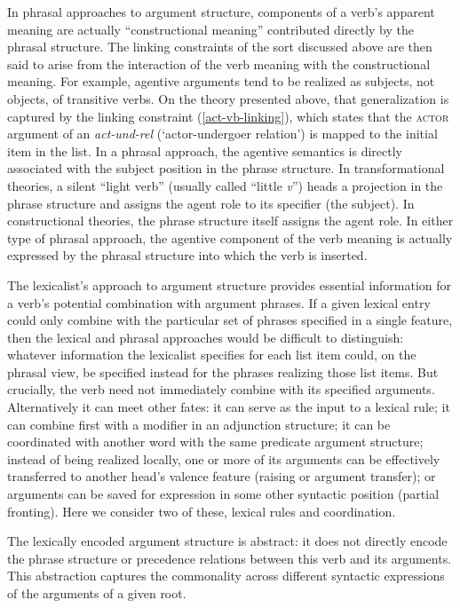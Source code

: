 \documentclass[output=paper
                ,modfonts
                ,nonflat
	        ,collection
	        ,collectionchapter
	        ,collectiontoclongg
 	        ,biblatex
                ,babelshorthands
                ,newtxmath
                ,draftmode
                ,colorlinks, citecolor=brown
]{./langsci/langscibook}
\begin{document}
In phrasal approaches  to argument structure, components of a verb's apparent meaning are actually ``constructional meaning'' contributed directly by the phrasal structure.  The linking constraints of the sort discussed above are then said to arise from the interaction of the verb meaning with the constructional meaning.  For example, agentive arguments tend to be realized as subjects, not objects, of transitive verbs.  On the theory presented above, that generalization is captured by the linking constraint (\ref{act-vb-linking}), which states that the \textsc{actor} argument of an \textit{act-und-rel} (`actor-undergoer relation') is mapped to the initial item in the \argst list.  In a phrasal approach, the agentive semantics is directly associated with the subject position in the phrase structure.  In transformational theories, a silent ``light verb'' (usually called ``little \textit{v}'') heads a projection in the phrase structure and assigns the agent role to its specifier (the subject).  In constructional theories, the phrase structure itself assigns the agent role.  In either type of phrasal approach, the agentive component of the verb meaning is actually expressed by the phrasal structure into which the verb is inserted.  


The lexicalist’s approach to argument structure provides essential information for a verb's potential
combination with argument phrases.   If a given lexical entry could only  combine with the particular set of phrases specified in a single \val feature, then the lexical and phrasal approaches would be difficult to distinguish: whatever information the lexicalist specifies for each \val list item could, on the phrasal view, be specified instead for the phrases realizing those list items.  
But crucially, the verb need not immediately combine with its specified
arguments.  Alternatively it can meet other fates: it can serve as the input to a lexical rule; it
can combine first with a modifier in an adjunction structure; it can be coordinated with another
word with the same predicate argument structure; instead of being realized locally, one or more of
its arguments can be effectively transferred to another head’s valence feature (raising or argument
transfer); or arguments can be saved for expression in some other syntactic position (partial
fronting).   Here we consider two of these, lexical rules and coordination.  
 
The lexically encoded argument structure is abstract: it does not directly encode the phrase structure or
precedence relations between this verb and its arguments. This abstraction captures the commonality
across different syntactic expressions of the arguments of a given root.
\end{document}

